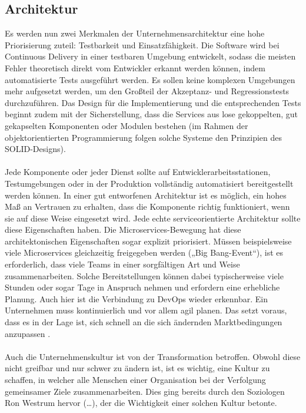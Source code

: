 \subsection{Architektur}
Es werden nun zwei Merkmalen der Unternehmensarchitektur eine hohe Priorisierung zuteil: Testbarkeit und Einsatzfähigkeit. Die Software wird bei Continuous Delivery in einer testbaren Umgebung entwickelt, sodass die meisten Fehler theoretisch direkt vom Entwickler erkannt werden können, indem automatisierte Tests ausgeführt werden. Es sollen keine komplexen Umgebungen mehr aufgesetzt werden, um den Großteil der Akzeptanz- und Regressionstests durchzuführen. Das Design für die Implementierung und die entsprechenden Tests beginnt zudem mit der Sicherstellung, dass die Services aus lose gekoppelten, gut gekapselten Komponenten oder Modulen bestehen (im Rahmen der objektorientierten Programmierung folgen solche Systeme den Prinzipien des SOLID-Designs).\\ \\ Jede Komponente oder jeder Dienst sollte auf Entwicklerarbeitsstationen, Testumgebungen oder in der Produktion vollständig automatisiert bereitgestellt werden können. In einer gut entworfenen Architektur ist es möglich, ein hohes Maß an Vertrauen zu erhalten, dass die Komponente richtig funktioniert, wenn sie auf diese Weise eingesetzt wird. Jede echte serviceorientierte Architektur sollte diese Eigenschaften haben. Die Microservices-Bewegung hat diese architektonischen Eigenschaften sogar explizit priorisiert. Müssen beispielsweise viele Microservices gleichzeitig freigegeben werden („Big Bang-Event“), ist es erforderlich, dass viele Teams in einer sorgfältigen Art und Weise zusammenarbeiten. Solche Bereitstellungen können dabei typischerweise viele Stunden oder sogar Tage in Anspruch nehmen und erfordern eine erhebliche Planung. Auch hier ist die Verbindung zu DevOps wieder erkennbar. Ein Unternehmen muss kontinuierlich und vor allem agil planen. Das setzt voraus, dass es in der Lage ist, sich schnell an die sich ändernden Marktbedingungen anzupassen \cite{continuousdelivery.2017}.\\ \\
Auch die Unternehmenskultur ist von der Transformation betroffen. Obwohl diese nicht greifbar und nur schwer zu ändern ist, ist es wichtig, eine Kultur zu schaffen, in welcher alle Menschen einer Organisation bei der Verfolgung gemeinsamer Ziele zusammenarbeiten. Dies ging bereits durch den Soziologen Ron Westrum hervor (…), der die Wichtigkeit einer solchen Kultur betonte.\\ \\
